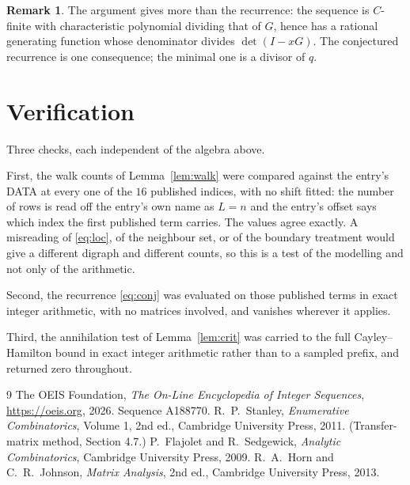 \documentclass[11pt,a4paper]{article}
\theoremstyle{plain}
\theoremstyle{definition}
\newtheorem{remark}[theorem]{Remark}
\begin{document}
\begin{remark}
The argument gives more than the recurrence: the sequence is $C$-finite with characteristic
polynomial dividing that of $G$, hence has a rational generating function whose denominator
divides $\det(I-xG)$. The conjectured recurrence is one consequence; the minimal one is a
divisor of $q$.
\end{remark}

\section{Verification}

Three checks, each independent of the algebra above.

First, the walk counts of Lemma~\ref{lem:walk} were compared against the entry's DATA at
every one of the $16$ published indices, with no shift fitted: the number of rows is
read off the entry's own name as $L=n$ and the entry's offset says which index the first
published term carries. The values agree exactly. A misreading of \eqref{eq:loc}, of the
neighbour set, or of the boundary treatment would give a different digraph and different
counts, so this is a test of the modelling and not only of the arithmetic.

Second, the recurrence \eqref{eq:conj} was evaluated on those published terms in exact
integer arithmetic, with no matrices involved, and vanishes wherever it applies.

Third, the annihilation test of Lemma~\ref{lem:crit} was carried to the full
Cayley--Hamilton bound in exact integer arithmetic rather than to a sampled prefix, and
returned zero throughout.

\begin{thebibliography}{9}
 The OEIS Foundation, \emph{The On-Line Encyclopedia of Integer
Sequences}, \url{https://oeis.org}, 2026. Sequence A188770.
 R.~P.~Stanley, \emph{Enumerative Combinatorics}, Volume 1, 2nd ed.,
Cambridge University Press, 2011. (Transfer-matrix method, Section 4.7.)
 P.~Flajolet and R.~Sedgewick, \emph{Analytic Combinatorics}, Cambridge
University Press, 2009.
 R.~A.~Horn and C.~R.~Johnson, \emph{Matrix Analysis}, 2nd ed., Cambridge
University Press, 2013.
\end{thebibliography}
\end{document}

